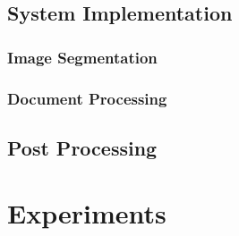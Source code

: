 \documentclass[10pt, conference, compsocconf]{IEEEtran}
\begin{document}


		\subsection{System Implementation}



			\subsubsection{Image Segmentation}


			


			\subsubsection{Document Processing}



		\subsection{Post Processing}





	\section{Experiments}




	
\end{document}
